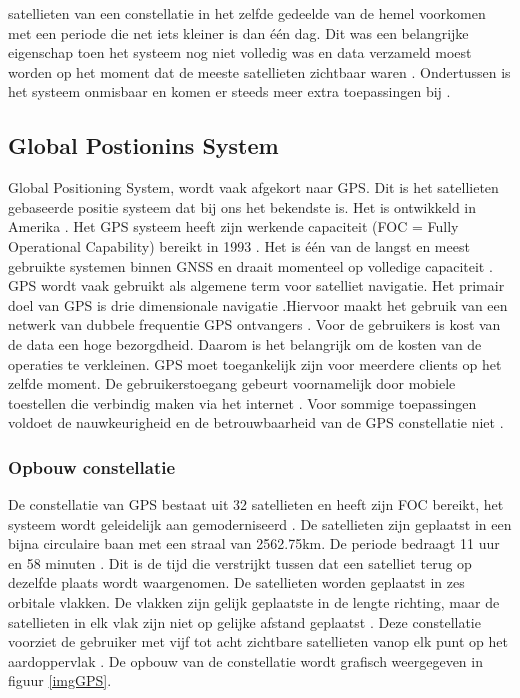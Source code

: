 satellieten van een constellatie in het zelfde gedeelde van de hemel voorkomen met een periode die net iets kleiner is dan \'e\'en dag. Dit was een belangrijke eigenschap toen het systeem nog niet volledig was en data verzameld moest worden op het moment dat de meeste satellieten zichtbaar waren \cite{LBibGNSS7}. Ondertussen is het systeem onmisbaar en komen er steeds meer extra toepassingen bij \cite{LBibGNSS8}.

\subsection{Global Postionins System}
\label{LGPS} 
Global Positioning System, wordt vaak afgekort naar GPS. Dit is het satellieten gebaseerde positie systeem dat bij ons het bekendste is. Het is ontwikkeld in Amerika \cite{LBibGNSS, LBibGNSS3}. Het GPS systeem heeft zijn werkende capaciteit (FOC = Fully Operational Capability) bereikt in 1993 \cite{LBibGPS4}. Het is \'e\'en van de langst en meest gebruikte systemen binnen GNSS en draait momenteel op volledige capaciteit \cite{LBibGNSS4,LBibGNSS8}. GPS wordt vaak gebruikt als algemene term voor satelliet navigatie. Het primair doel van GPS is drie dimensionale navigatie \cite{LBibGNSS8}.Hiervoor maakt het gebruik van een netwerk van dubbele frequentie GPS ontvangers \cite{LBibGPS5}. Voor de gebruikers is kost van de data een hoge bezorgdheid. Daarom is het belangrijk om de kosten van de operaties te verkleinen. GPS moet toegankelijk zijn voor meerdere clients op het zelfde moment. De gebruikerstoegang gebeurt voornamelijk door mobiele toestellen die verbindig maken via het internet \cite{LBibGPS}. Voor sommige toepassingen voldoet de nauwkeurigheid en de betrouwbaarheid van de GPS constellatie niet \cite{LBibGNSS6}.

\subsubsection{Opbouw constellatie}
 De constellatie van GPS bestaat uit 32 satellieten en heeft zijn FOC bereikt, het systeem wordt geleidelijk aan gemoderniseerd \cite{LBibGNSS4}. De satellieten zijn geplaatst in een bijna circulaire baan met een straal van 2562.75km. De periode bedraagt 11 uur en 58 minuten \cite{LBibGNSS6,LBibGNSS8}. Dit is de tijd die verstrijkt tussen dat een satelliet terug op dezelfde plaats wordt waargenomen. De satellieten worden geplaatst in zes orbitale vlakken. De vlakken zijn gelijk geplaatste in de lengte richting, maar de satellieten in elk vlak zijn niet op gelijke afstand geplaatst \cite{LBibGNSS6}. Deze constellatie voorziet de gebruiker met vijf tot acht zichtbare satellieten vanop elk punt op het aardoppervlak \cite{LBibGNSS8}. De opbouw van de constellatie wordt grafisch weergegeven in figuur \ref{imgGPS}.
 
